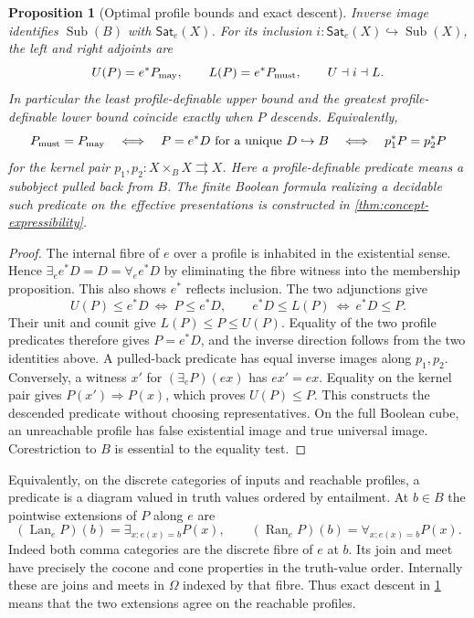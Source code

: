 \documentclass[11pt,a4paper]{article}
\newtheorem{proposition}[proposition]{Proposition}
\theoremstyle{definition}
\theoremstyle{remark}\newaliascnt{remark}{theorem}
\numberwithin{equation}{section}
\begin{document}
\begin{proposition}[Optimal profile bounds and exact descent]\label{prop:profile-adjoints}
Inverse image identifies \(\operatorname{Sub}(B)\) with \(\mathsf{Sat}_e(X)\). For its inclusion \(i:\mathsf{Sat}_e(X)\hookrightarrow\operatorname{Sub}(X)\), the left and right adjoints are
\[
 U(P)=e^*P_{\rm may},\qquad L(P)=e^*P_{\rm must},\qquad U\dashv i\dashv L .
\]
In particular the least profile-definable upper bound and the greatest profile-definable lower bound coincide exactly when \(P\) descends. Equivalently,
\[
 P_{\rm must}=P_{\rm may}
 \quad\Longleftrightarrow\quad P=e^*D\text{ for a unique }D\hookrightarrow B
 \quad\Longleftrightarrow\quad p_1^*P=p_2^*P
\]
for the kernel pair \(p_1,p_2:X\times_B X\rightrightarrows X\). Here a profile-definable predicate means a subobject pulled back from \(B\). The finite Boolean formula realizing a decidable such predicate on the effective presentations is constructed in \cref{thm:concept-expressibility}.
\end{proposition}
\begin{proof}
The internal fibre of \(e\) over a profile is inhabited in the existential sense. Hence \(\exists_e e^*D=D=\forall_e e^*D\) by eliminating the fibre witness into the membership proposition. This also shows \(e^*\) reflects inclusion. The two adjunctions give
\[
 U(P)\le e^*D\ \Longleftrightarrow\ P\le e^*D,\qquad
 e^*D\le L(P)\ \Longleftrightarrow\ e^*D\le P .
\]
Their unit and counit give \(L(P)\le P\le U(P)\). Equality of the two profile predicates therefore gives \(P=e^*D\), and the inverse direction follows from the two identities above. A pulled-back predicate has equal inverse images along \(p_1,p_2\). Conversely, a witness \(x'\) for \((\exists_eP)(e x)\) has \(e x'=e x\). Equality on the kernel pair gives \(P(x')\Rightarrow P(x)\), which proves \(U(P)\le P\). This constructs the descended predicate without choosing representatives. On the full Boolean cube, an unreachable profile has false existential image and true universal image. Corestriction to \(B\) is essential to the equality test.
\end{proof}
Equivalently, on the discrete categories of inputs and reachable profiles, a predicate is a diagram valued in truth values ordered by entailment. At \(b\in B\) the pointwise extensions of \(P\) along \(e\) are
\[
 (\operatorname{Lan}_e P)(b)=\exists_{x:e(x)=b}P(x),\qquad
 (\operatorname{Ran}_e P)(b)=\forall_{x:e(x)=b}P(x).
\]
Indeed both comma categories are the discrete fibre of \(e\) at \(b\). Its join and meet have precisely the cocone and cone properties in the truth-value order. Internally these are joins and meets in \(\Omega\) indexed by that fibre. Thus exact descent in \cref{prop:profile-adjoints} means that the two extensions agree on the reachable profiles.
\end{document}

